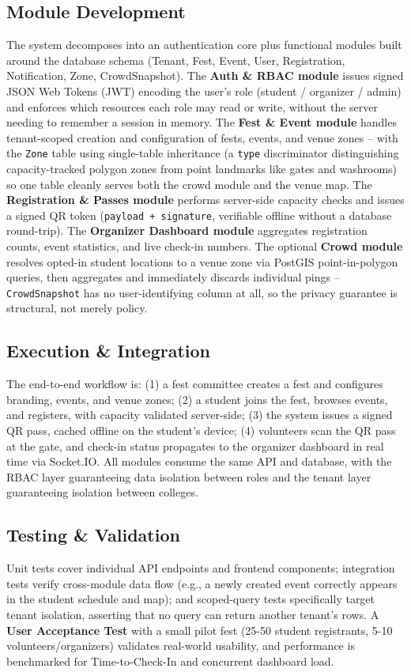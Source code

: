 \documentclass[11pt,a4paper]{article}
\begin{document}
\subsection{Module Development}
The system decomposes into an authentication core plus functional modules built around
the database schema (Tenant, Fest, Event, User, Registration, Notification, Zone,
CrowdSnapshot). The \textbf{Auth \& RBAC module} issues signed JSON Web Tokens (JWT)
encoding the user's role (student / organizer / admin) and enforces which resources
each role may read or write, without the server needing to remember a session in
memory. The \textbf{Fest \& Event module} handles tenant-scoped creation and
configuration of fests, events, and venue zones -- with the \texttt{Zone} table using
single-table inheritance (a \texttt{type} discriminator distinguishing capacity-tracked
polygon zones from point landmarks like gates and washrooms) so one table cleanly
serves both the crowd module and the venue map. The \textbf{Registration \& Passes
module} performs server-side capacity checks and issues a signed QR token
(\texttt{payload~+~signature}, verifiable offline without a database round-trip). The
\textbf{Organizer Dashboard module} aggregates registration counts, event statistics,
and live check-in numbers. The optional \textbf{Crowd module} resolves opted-in student
locations to a venue zone via PostGIS point-in-polygon queries, then aggregates and
immediately discards individual pings -- \texttt{CrowdSnapshot} has no user-identifying
column at all, so the privacy guarantee is structural, not merely policy.

\subsection{Execution \& Integration}
The end-to-end workflow is: (1) a fest committee creates a fest and configures
branding, events, and venue zones; (2) a student joins the fest, browses events, and
registers, with capacity validated server-side; (3) the system issues a signed QR pass,
cached offline on the student's device; (4) volunteers scan the QR pass at the gate,
and check-in status propagates to the organizer dashboard in real time via Socket.IO.
All modules consume the same API and database, with the RBAC layer guaranteeing data
isolation between roles and the tenant layer guaranteeing isolation between colleges.

\subsection{Testing \& Validation}
Unit tests cover individual API endpoints and frontend components; integration tests
verify cross-module data flow (e.g., a newly created event correctly appears in the
student schedule and map); and scoped-query tests specifically target tenant isolation,
asserting that no query can return another tenant's rows. A \textbf{User Acceptance
Test} with a small pilot fest (25-50 student registrants, 5-10
volunteers/organizers) validates real-world usability, and performance is benchmarked
for Time-to-Check-In and concurrent dashboard load.
\end{document}

